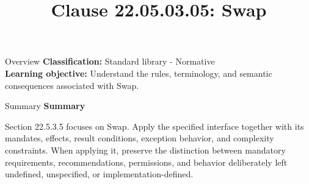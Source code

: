 \documentclass[10pt,letterpaper]{article}
\title{Clause 22.05.03.05: Swap}
\author{}
\date{}
\begin{document}
\maketitle
\begin{CornellOverviewBox}{Overview}
\textbf{Classification:} Standard library - Normative\\[2pt]
\textbf{Learning objective:} Understand the rules, terminology, and semantic consequences associated with Swap.
\end{CornellOverviewBox}\begin{CornellSummaryBox}{Summary}
{\sffamily\bfseries\color{Accent} Summary}\par\vspace{3pt}Section 22.5.3.5 focuses on Swap. Apply the specified interface together with its mandates, effects, result conditions, exception behavior, and complexity constraints. When applying it, preserve the distinction between mandatory requirements, recommendations, permissions, and behavior deliberately left undefined, unspecified, or implementation-defined.
\end{CornellSummaryBox}
\end{document}
